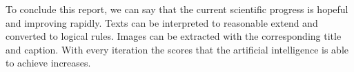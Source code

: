 To conclude this report, we can say that the current scientific progress is hopeful and improving rapidly.
Texts can be interpreted to reasonable extend and converted to logical rules.
Images can be extracted with the corresponding title and caption. 
With every iteration the scores that the artificial intelligence is able to achieve increases.